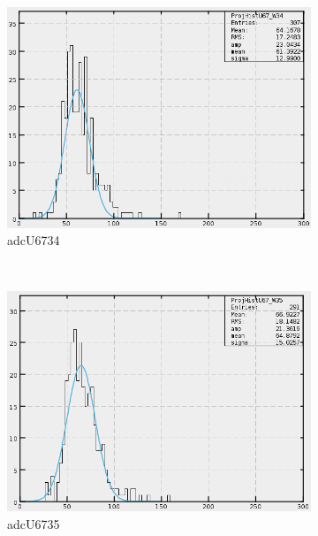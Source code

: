 \begin{figure}[h]
\begin{subfigure}[h]{0.3\textwidth}
        \includegraphics[width=\textwidth, keepaspectratio = true]{adcU67_34}
        \caption{adcU6734}
        \label{fig:adcU67_34}
    \end{subfigure}
    \\
    \begin{subfigure}[h]{0.3\textwidth}
        \centering
        \includegraphics[width=\textwidth, keepaspectratio = true]{adcU67_35}
        \caption{adcU6735}
        \label{fig:adcU67_35}
    \end{subfigure}
    ~
    \begin{subfigure}[h]{0.3\textwidth}
        \centering

\end{subfigure}
\end{figure}
